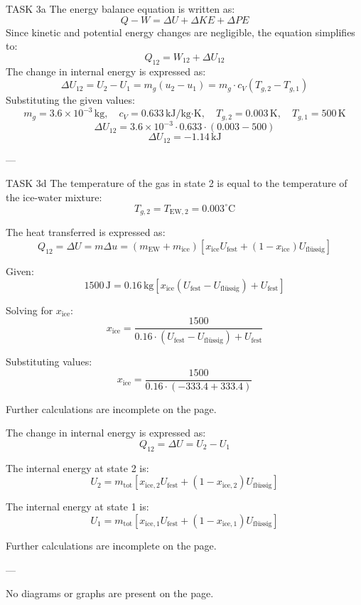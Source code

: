 TASK 3a  
The energy balance equation is written as:  
\[
Q - W = \Delta U + \Delta KE + \Delta PE
\]  
Since kinetic and potential energy changes are negligible, the equation simplifies to:  
\[
Q_{12} = W_{12} + \Delta U_{12}
\]  
The change in internal energy is expressed as:  
\[
\Delta U_{12} = U_2 - U_1 = m_g (u_2 - u_1) = m_g \cdot c_V (T_{g,2} - T_{g,1})
\]  
Substituting the given values:  
\[
m_g = 3.6 \times 10^{-3} \, \text{kg}, \quad c_V = 0.633 \, \text{kJ/kg·K}, \quad T_{g,2} = 0.003 \, \text{K}, \quad T_{g,1} = 500 \, \text{K}
\]  
\[
\Delta U_{12} = 3.6 \times 10^{-3} \cdot 0.633 \cdot (0.003 - 500)
\]  
\[
\Delta U_{12} = -1.14 \, \text{kJ}
\]  

---

TASK 3d  
The temperature of the gas in state 2 is equal to the temperature of the ice-water mixture:  
\[
T_{g,2} = T_{\text{EW},2} = 0.003^\circ \text{C}
\]  

The heat transferred is expressed as:  
\[
Q_{12} = \Delta U = m \Delta u = (m_{\text{EW}} + m_{\text{ice}}) \left[ x_{\text{ice}} U_{\text{fest}} + (1 - x_{\text{ice}}) U_{\text{flüssig}} \right]
\]  

Given:  
\[
1500 \, \text{J} = 0.16 \, \text{kg} \left[ x_{\text{ice}} (U_{\text{fest}} - U_{\text{flüssig}}) + U_{\text{fest}} \right]
\]  

Solving for \( x_{\text{ice}} \):  
\[
x_{\text{ice}} = \frac{1500}{0.16 \cdot (U_{\text{fest}} - U_{\text{flüssig}}) + U_{\text{fest}}}
\]  

Substituting values:  
\[
x_{\text{ice}} = \frac{1500}{0.16 \cdot (-333.4 + 333.4)}
\]  

Further calculations are incomplete on the page.  

The change in internal energy is expressed as:  
\[
Q_{12} = \Delta U = U_2 - U_1
\]  

The internal energy at state 2 is:  
\[
U_2 = m_{\text{tot}} \left[ x_{\text{ice},2} U_{\text{fest}} + (1 - x_{\text{ice},2}) U_{\text{flüssig}} \right]
\]  

The internal energy at state 1 is:  
\[
U_1 = m_{\text{tot}} \left[ x_{\text{ice},1} U_{\text{fest}} + (1 - x_{\text{ice},1}) U_{\text{flüssig}} \right]
\]  

Further calculations are incomplete on the page.  

---

No diagrams or graphs are present on the page.